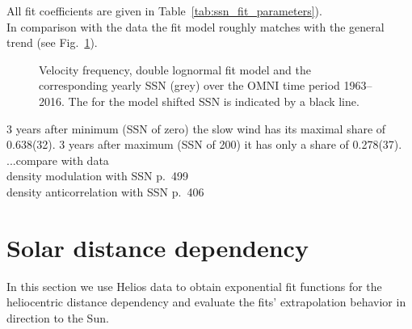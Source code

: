 All fit coefficients are given in Table~\ref{tab:ssn_fit_parameters}).\\

In comparison with the data the fit model roughly matches with the general trend (see Fig.~\ref{fig:OMNI_yearly_VSSN_dblfit_plot}).\\
\begin{figure}
	\caption{Velocity frequency, double lognormal fit model and the corresponding yearly SSN (grey) over the OMNI time period 1963--2016. The for the model shifted SSN is indicated by a black line.}
	\label{fig:OMNI_yearly_VSSN_dblfit_plot}
\end{figure}
3 years after minimum (SSN of zero) the slow wind has its maximal share of 0.638(32). 3 years after maximum (SSN of 200) it has only a share of 0.278(37).\\
...compare with data\\

density modulation with SSN \citep{Schwenn1983} p.~499\\
density anticorrelation with SSN \citep{Bougeret1984} p.~406\\


\section{Solar distance dependency}
\label{sec:solar_distance_dependency}

In this section we use Helios data to obtain exponential fit functions for the heliocentric distance dependency and evaluate the fits' extrapolation behavior in direction to the Sun.

